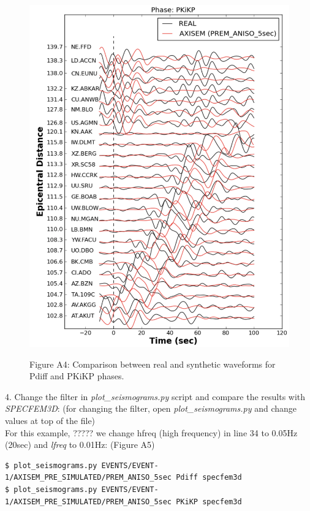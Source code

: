 \documentclass{article}
\begin{document}
\begin{figure}
\begin{minipage}{.5\textwidth}
  \includegraphics[width=1.\linewidth]{AXISEMTutorial-fig009.pdf}
\end{minipage}
\begin{center}
{\small{}Figure A4: Comparison between real and synthetic waveforms for Pdiff and 
PKiKP phases.}
\end{center}
\end{figure}


4. Change the filter in \textit{plot\_seismograms.py} script and compare the results with 
\textit{SPECFEM3D}: (for changing the filter, open \textit{plot\_seismograms.py} and change 
values at top of the file) \\
For this example, ????? we change hfreq (high frequency) in line 34 to 0.05Hz (20sec) and \textit{lfreq }to 0.01Hz: (Figure 
A5)

\begin{lstlisting}
$ plot_seismograms.py EVENTS/EVENT-1/AXISEM_PRE_SIMULATED/PREM_ANISO_5sec Pdiff specfem3d
$ plot_seismograms.py EVENTS/EVENT-1/AXISEM_PRE_SIMULATED/PREM_ANISO_5sec PKiKP specfem3d
\end{lstlisting}
\end{document}
